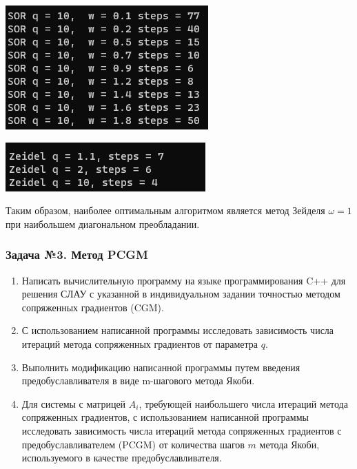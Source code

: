 \documentclass[a4paper, fontsize=14pt]{article}
\begin{document}
\begin{center}
    \includegraphics[]{src/sor10.png}
    \label{fig:sor10}
\end{center}

\begin{center}
    \includegraphics[]{src/zeidel.png}
    \label{fig:zeidel}
\end{center}

Таким образом, наиболее оптимальным алгоритмом является метод Зейделя $\omega = 1$ при наибольшем диагональном преобладании.


\subsubsection*{Задача №3. Метод PCGM}
\begin{enumerate}
    \item Написать вычислительную программу на языке программирования C++
    для решения СЛАУ с указанной в индивидуальном задании точностью
    методом сопряженных градиентов (CGM).
    \item  С использованием написанной программы исследовать зависимость
    числа итераций метода сопряженных градиентов от параметра $q$.
    \item  Выполнить модификацию написанной программы путем введения
    предобуславливателя в виде m-шагового метода Якоби.
    \item  Для системы с матрицей $A_i$, требующей наибольшего числа итераций
    метода сопряженных градиентов, с использованием написанной
    программы исследовать зависимость числа итераций метода
    сопряженных градиентов с предобуславливателем (PCGM) от количества
    шагов $m$ метода Якоби, используемого в качестве предобуславливателя.
\end{enumerate}
\end{document}
